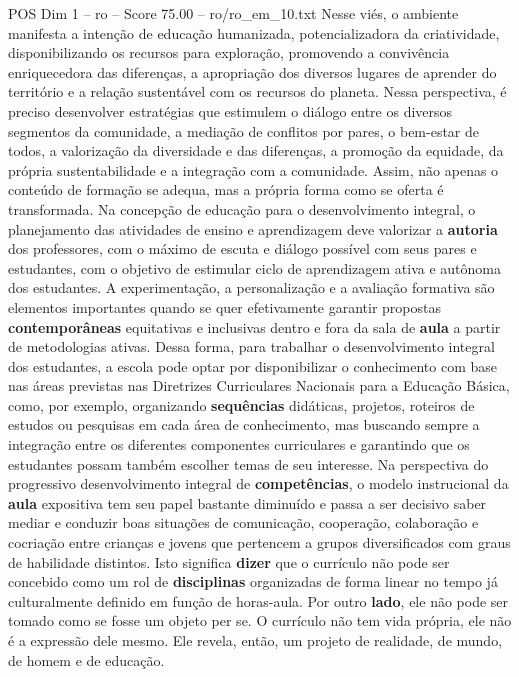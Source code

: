 \begin{textsample}{POS Dim 1 – ro – Score 75.00 – ro/ro\_em\_10.txt}
Nesse viés, o ambiente manifesta a intenção de educação humanizada, potencializadora da criatividade, disponibilizando os recursos para exploração, promovendo a convivência enriquecedora das diferenças, a apropriação dos diversos lugares de aprender do território e a relação sustentável com os recursos do planeta.
Nessa perspectiva, é preciso desenvolver estratégias que estimulem o diálogo entre os diversos segmentos da comunidade, a mediação de conflitos por pares, o bem-estar de todos, a valorização da diversidade e das diferenças, a promoção da equidade, da própria sustentabilidade e a integração com a comunidade.
Assim, não apenas o conteúdo de formação se adequa, mas a própria forma como se oferta é transformada.
Na concepção de educação para o desenvolvimento integral, o planejamento das atividades de ensino e aprendizagem deve valorizar a \textbf{autoria} dos professores, com o máximo de escuta e diálogo possível com seus pares e estudantes, com o objetivo de estimular ciclo de aprendizagem ativa e autônoma dos estudantes.
A experimentação, a personalização e a avaliação formativa são elementos importantes quando se quer efetivamente garantir propostas \textbf{contemporâneas} equitativas e inclusivas dentro e fora da sala de \textbf{aula} a partir de metodologias ativas.
Dessa forma, para trabalhar o desenvolvimento integral dos estudantes, a escola pode optar por disponibilizar o conhecimento com base nas áreas previstas nas Diretrizes Curriculares Nacionais para a Educação Básica, como, por exemplo, organizando \textbf{sequências} didáticas, projetos, roteiros de estudos ou pesquisas em cada área de conhecimento, mas buscando sempre a integração entre os diferentes componentes curriculares e garantindo que os estudantes possam também escolher temas de seu interesse.
Na perspectiva do progressivo desenvolvimento integral de \textbf{competências}, o modelo instrucional da \textbf{aula} expositiva tem seu papel bastante diminuído e passa a ser decisivo saber mediar e conduzir boas situações de comunicação, cooperação, colaboração e cocriação entre crianças e jovens que pertencem a grupos diversificados com graus de habilidade distintos.
Isto significa \textbf{dizer} que o currículo não pode ser concebido como um rol de \textbf{disciplinas} organizadas de forma linear no tempo já culturalmente definido em função de horas-aula.
Por outro \textbf{lado}, ele não pode ser tomado como se fosse um objeto per se.
O currículo não tem vida própria, ele não é a expressão dele mesmo.
Ele revela, então, um projeto de realidade, de mundo, de homem e de educação.

\end{textsample}
